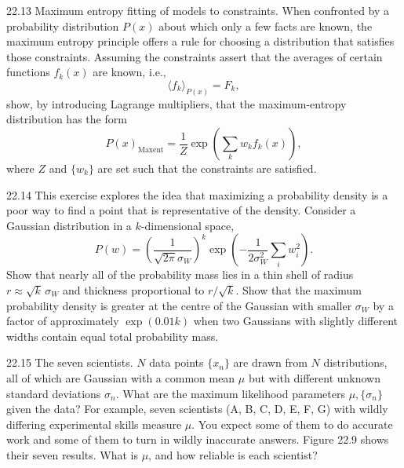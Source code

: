 \documentclass[12pt, a4paper]{article}
\begin{document}
\begin{prob}{22.13}
Maximum entropy fitting of models to constraints. When confronted by a probability distribution $P(x)$ about which only a few facts are known, the maximum entropy principle offers a rule for choosing a distribution that satisfies those constraints. Assuming the constraints assert that the averages of certain functions $f_k(x)$ are known, i.e.,
\[
\langle f_k \rangle_{P(x)} = F_k,
\]
show, by introducing Lagrange multipliers, that the maximum-entropy distribution has the form
\[
P(x)_{\mathrm{Maxent}} = \frac{1}{Z}\exp\left(\sum_k w_k f_k(x)\right),
\]
where $Z$ and $\{w_k\}$ are set such that the constraints are satisfied.
\end{prob}
\begin{sol}
\end{sol}
\bigskip

\begin{prob}{22.14}
This exercise explores the idea that maximizing a probability density is a poor way to find a point that is representative of the density. Consider a Gaussian distribution in a $k$-dimensional space,
\[
P(w) = \left(\frac{1}{\sqrt{2\pi}\sigma_W}\right)^k\exp\left(-\frac{1}{2\sigma_W^2}\sum_i w_i^2\right).
\]
Show that nearly all of the probability mass lies in a thin shell of radius $r \approx \sqrt{k}\,\sigma_W$ and thickness proportional to $r/\sqrt{k}$. Show that the maximum probability density is greater at the centre of the Gaussian with smaller $\sigma_W$ by a factor of approximately $\exp(0.01k)$ when two Gaussians with slightly different widths contain equal total probability mass.
\end{prob}
\begin{sol}
\end{sol}
\bigskip

\begin{prob}{22.15}
The seven scientists. $N$ data points $\{x_n\}$ are drawn from $N$ distributions, all of which are Gaussian with a common mean $\mu$ but with different unknown standard deviations $\sigma_n$. What are the maximum likelihood parameters $\mu, \{\sigma_n\}$ given the data? For example, seven scientists (A, B, C, D, E, F, G) with wildly differing experimental skills measure $\mu$. You expect some of them to do accurate work and some of them to turn in wildly inaccurate answers. Figure 22.9 shows their seven results. What is $\mu$, and how reliable is each scientist?
\end{prob}
\begin{sol}
\end{sol}
\bigskip
\end{document}
